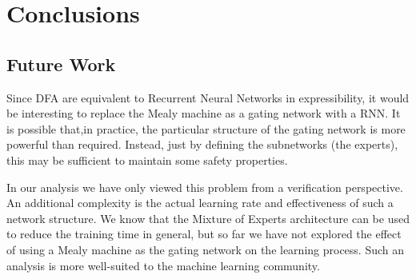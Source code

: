 \section{Conclusions}

\subsection{Future Work}

Since DFA are equivalent to Recurrent Neural Networks in expressibility, it would be interesting to replace the Mealy machine as a gating network with a RNN.
It is possible that,in practice, the particular structure of the gating network is more powerful than required. 
Instead, just by defining the subnetworks (the experts), this may be sufficient to maintain some safety properties.

In our analysis we have only viewed this problem from a verification perspective. 
An additional complexity is the actual learning rate and effectiveness of such a network structure.
We know that the Mixture of Experts architecture can be used to reduce the training time in general, but so far we have not explored the effect of using a Mealy machine as the gating network on the learning process.
Such an analysis is more well-suited to the machine learning community.

